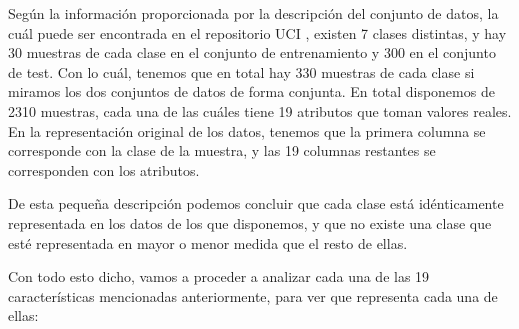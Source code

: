 \documentclass[11pt,a4paper]{article}
\begin{document}
Según la información proporcionada por la descripción del conjunto de datos, la cuál puede ser encontrada en el
repositorio UCI \cite{bib:uci-repo}, existen 7 clases distintas, y hay 30 muestras de cada clase en el conjunto de
entrenamiento y 300 en el conjunto de test. Con lo cuál, tenemos que en total hay 330 muestras de cada clase si miramos
los dos conjuntos de datos de forma conjunta. En total disponemos de 2310 muestras, cada una de las cuáles tiene 19
atributos que toman valores reales. En la representación original de los datos, tenemos que la primera columna se
corresponde con la clase de la muestra, y las 19 columnas restantes se corresponden con los atributos. 

De esta pequeña descripción podemos concluir que cada clase está idénticamente representada en los datos de los que
disponemos, y que no existe una clase que esté representada en mayor o menor medida que el resto de ellas. 

Con todo esto dicho, vamos a proceder a analizar cada una de las 19 características mencionadas anteriormente, para ver
que representa cada una de ellas:
\end{document}
